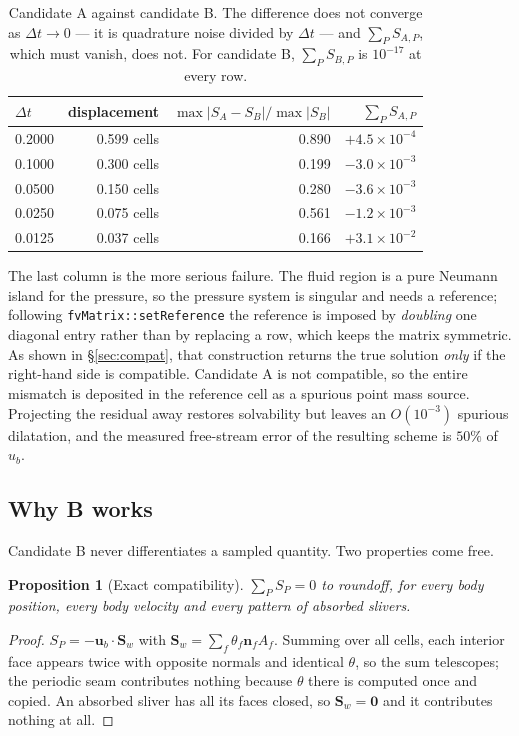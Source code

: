 \documentclass[11pt,a4paper]{article}
\newtheorem{proposition}{Proposition}
\theoremstyle{remark}
\newcommand{\uu}{\bm{u}}
\newcommand{\nn}{\bm{n}}
\newcommand{\Sw}{\bm{S}_w}
\newcommand{\ub}{\uu_b}
\newcommand{\dt}{\Delta t}
\begin{document}
\begin{table}[t]
\centering\small
\begin{tabular}{@{}lrrr@{}}
\toprule
$\dt$ & displacement & $\max|S_A-S_B|/\max|S_B|$ & $\sum_P S_{A,P}$ \\
\midrule
0.2000 & 0.599 cells & 0.890 & $+4.5\times10^{-4}$\\
0.1000 & 0.300 cells & 0.199 & $-3.0\times10^{-3}$\\
0.0500 & 0.150 cells & 0.280 & $-3.6\times10^{-3}$\\
0.0250 & 0.075 cells & 0.561 & $-1.2\times10^{-3}$\\
0.0125 & 0.037 cells & 0.166 & $+3.1\times10^{-2}$\\
\bottomrule
\end{tabular}
\caption{Candidate A against candidate B. The difference does not converge as $\dt\to0$ --- it
is quadrature noise divided by $\dt$ --- and $\sum_P S_{A,P}$, which must vanish, does not.
For candidate B, $\sum_P S_{B,P}$ is $10^{-17}$ at every row.}
\label{tab:AB}
\end{table}

The last column is the more serious failure. The fluid region is a pure Neumann island for the
pressure, so the pressure system is singular and needs a reference; following
\texttt{fvMatrix::setReference} the reference is imposed by \emph{doubling} one diagonal entry
rather than by replacing a row, which keeps the matrix symmetric. As shown in
\S\ref{sec:compat}, that construction returns the true solution \emph{only} if the right-hand
side is compatible. Candidate A is not compatible, so the entire mismatch is deposited in the
reference cell as a spurious point mass source. Projecting the residual away restores
solvability but leaves an $O(10^{-3})$ spurious dilatation, and the measured free-stream error
of the resulting scheme is $50\%$ of $u_b$.

\subsection{Why B works}

Candidate B never differentiates a sampled quantity. Two properties come free.

\begin{proposition}[Exact compatibility]
$\sum_P S_P=0$ to roundoff, for every body position, every body velocity and every pattern of
absorbed slivers.
\end{proposition}
\begin{proof}
$S_P=-\ub\!\cdot\!\Sw$ with $\Sw=\sum_f\theta_f\nn_fA_f$. Summing over all cells, each interior
face appears twice with opposite normals and identical $\theta$, so the sum telescopes; the
periodic seam contributes nothing because $\theta$ there is computed once and copied. An absorbed
sliver has all its faces closed, so $\Sw=\bm{0}$ and it contributes nothing at all.
\end{proof}
\end{document}
